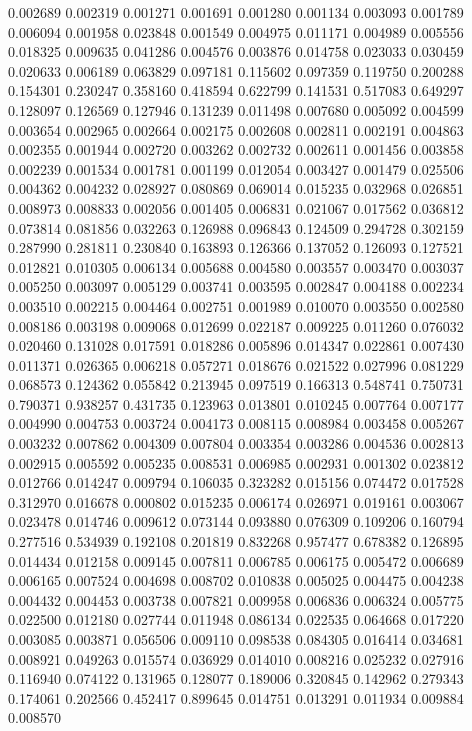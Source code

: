 0.002689
0.002319
0.001271
0.001691
0.001280
0.001134
0.003093
0.001789
0.006094
0.001958
0.023848
0.001549
0.004975
0.011171
0.004989
0.005556
0.018325
0.009635
0.041286
0.004576
0.003876
0.014758
0.023033
0.030459
0.020633
0.006189
0.063829
0.097181
0.115602
0.097359
0.119750
0.200288
0.154301
0.230247
0.358160
0.418594
0.622799
0.141531
0.517083
0.649297
0.128097
0.126569
0.127946
0.131239
0.011498
0.007680
0.005092
0.004599
0.003654
0.002965
0.002664
0.002175
0.002608
0.002811
0.002191
0.004863
0.002355
0.001944
0.002720
0.003262
0.002732
0.002611
0.001456
0.003858
0.002239
0.001534
0.001781
0.001199
0.012054
0.003427
0.001479
0.025506
0.004362
0.004232
0.028927
0.080869
0.069014
0.015235
0.032968
0.026851
0.008973
0.008833
0.002056
0.001405
0.006831
0.021067
0.017562
0.036812
0.073814
0.081856
0.032263
0.126988
0.096843
0.124509
0.294728
0.302159
0.287990
0.281811
0.230840
0.163893
0.126366
0.137052
0.126093
0.127521
0.012821
0.010305
0.006134
0.005688
0.004580
0.003557
0.003470
0.003037
0.005250
0.003097
0.005129
0.003741
0.003595
0.002847
0.004188
0.002234
0.003510
0.002215
0.004464
0.002751
0.001989
0.010070
0.003550
0.002580
0.008186
0.003198
0.009068
0.012699
0.022187
0.009225
0.011260
0.076032
0.020460
0.131028
0.017591
0.018286
0.005896
0.014347
0.022861
0.007430
0.011371
0.026365
0.006218
0.057271
0.018676
0.021522
0.027996
0.081229
0.068573
0.124362
0.055842
0.213945
0.097519
0.166313
0.548741
0.750731
0.790371
0.938257
0.431735
0.123963
0.013801
0.010245
0.007764
0.007177
0.004990
0.004753
0.003724
0.004173
0.008115
0.008984
0.003458
0.005267
0.003232
0.007862
0.004309
0.007804
0.003354
0.003286
0.004536
0.002813
0.002915
0.005592
0.005235
0.008531
0.006985
0.002931
0.001302
0.023812
0.012766
0.014247
0.009794
0.106035
0.323282
0.015156
0.074472
0.017528
0.312970
0.016678
0.000802
0.015235
0.006174
0.026971
0.019161
0.003067
0.023478
0.014746
0.009612
0.073144
0.093880
0.076309
0.109206
0.160794
0.277516
0.534939
0.192108
0.201819
0.832268
0.957477
0.678382
0.126895
0.014434
0.012158
0.009145
0.007811
0.006785
0.006175
0.005472
0.006689
0.006165
0.007524
0.004698
0.008702
0.010838
0.005025
0.004475
0.004238
0.004432
0.004453
0.003738
0.007821
0.009958
0.006836
0.006324
0.005775
0.022500
0.012180
0.027744
0.011948
0.086134
0.022535
0.064668
0.017220
0.003085
0.003871
0.056506
0.009110
0.098538
0.084305
0.016414
0.034681
0.008921
0.049263
0.015574
0.036929
0.014010
0.008216
0.025232
0.027916
0.116940
0.074122
0.131965
0.128077
0.189006
0.320845
0.142962
0.279343
0.174061
0.202566
0.452417
0.899645
0.014751
0.013291
0.011934
0.009884
0.008570

